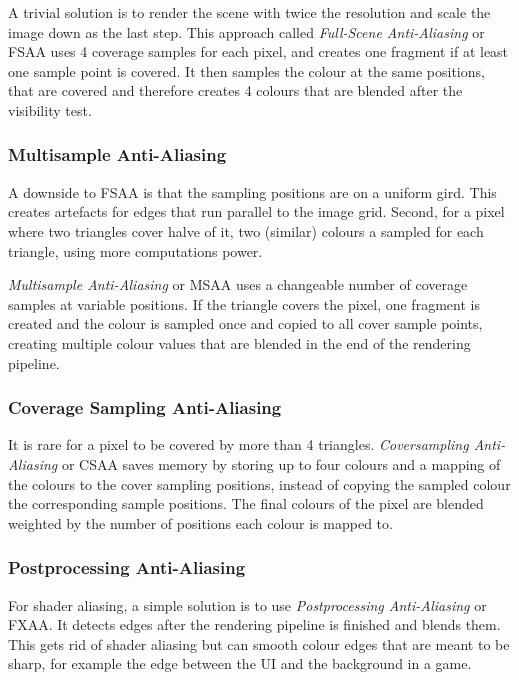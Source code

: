 \documentclass{panikzettel}
\begin{document}
A trivial solution is to render the scene with twice the resolution and scale the image down as the last step. This approach called \emph{Full-Scene Anti-Aliasing} or FSAA uses 4 coverage samples for each pixel, and creates one fragment if at least one sample point is covered.
It then samples the colour at the same positions, that are covered and therefore creates 4 colours that are blended after the visibility test.

\subsubsection*{Multisample Anti-Aliasing}

A downside to FSAA is that the sampling positions are on a uniform gird. This creates artefacts for edges that run parallel to the image grid.
Second, for a pixel where two triangles cover halve of it, two (similar) colours a sampled for each triangle, using more computations power.

\emph{Multisample Anti-Aliasing} or MSAA uses a changeable number of coverage samples at variable positions. If the triangle covers the pixel, one fragment is created and the colour is sampled once and copied to all cover sample points, creating multiple colour values that are blended in the end of the rendering pipeline.

\subsubsection*{Coverage Sampling Anti-Aliasing}

It is rare for a pixel to be covered by more than 4 triangles. \emph{Coversampling Anti-Aliasing} or CSAA saves memory by storing up to four colours and a mapping of the colours to the cover sampling positions, instead of copying the sampled colour the corresponding sample positions. The final colours of the pixel are blended weighted by the number of positions each colour is mapped to.

\subsubsection*{Postprocessing Anti-Aliasing}

For shader aliasing, a simple solution is to use \emph{Postprocessing Anti-Aliasing} or FXAA. It detects edges after the rendering pipeline is finished and blends them. This gets rid of shader aliasing but can smooth colour edges that are meant to be sharp, for example the edge between the UI and the background in a game.
\end{document}
